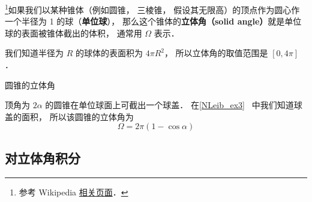 
\begin{issues}
\issueTODO
\end{issues}


\footnote{参考 Wikipedia \href{https://en.wikipedia.org/wiki/Solid_angle}{相关页面}．}如果我们以某种锥体（例如圆锥， 三棱锥， 假设其无限高）的顶点作为圆心作一个半径为 1 的球（\textbf{单位球}）， 那么这个锥体的\textbf{立体角（solid angle）}就是单位球的表面被锥体截出的体积， 通常用 $\Omega$ 表示．

我们知道半径为 $R$ 的球体的表面积为 $4\pi R^2$， 所以立体角的取值范围是 $[0, 4\pi]$．

\begin{example}{圆锥的立体角}

顶角为 $2\alpha$ 的圆锥在单位球面上可截出一个球盖． 在\autoref{NLeib_ex3}~ 中我们知道球盖的面积， 所以该圆锥的立体角为
\begin{equation}
\Omega = 2\pi (1 - \cos\alpha)
\end{equation}
\end{example}

\subsection{对立体角积分}
